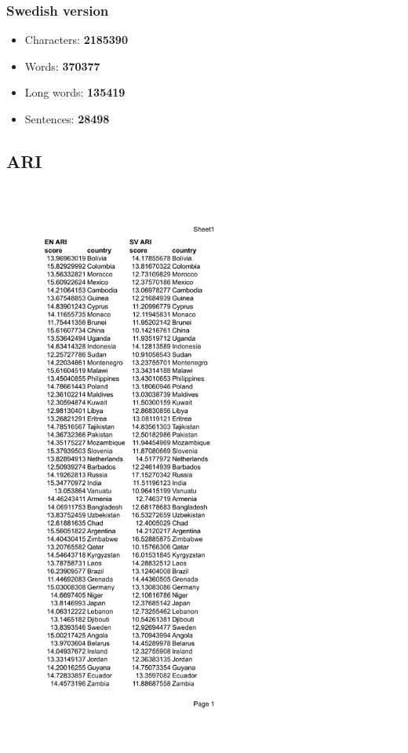 \documentclass[a4paper]{article}
\begin{document}
\subsubsection{Swedish version}
\begin{itemize}
	\item Characters: \textbf{2185390}
	\item Words: \textbf{370377}
	\item Long words: \textbf{135419}
	\item Sentences: \textbf{28498}
\end{itemize}

\subsection{ARI}
\includegraphics[page=1,scale=0.75]{./DATA/ARI.pdf}
\end{document}

